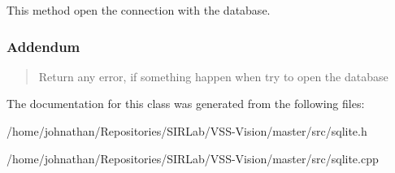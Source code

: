 This method open the connection with the database. 

\subsubsection*{Addendum }\begin{quote}
Return any error, if something happen when try to open the database \end{quote}


The documentation for this class was generated from the following files\+:\begin{DoxyCompactItemize}
\item 
/home/johnathan/\+Repositories/\+S\+I\+R\+Lab/\+V\+S\+S-\/\+Vision/master/src/sqlite.\+h\item 
/home/johnathan/\+Repositories/\+S\+I\+R\+Lab/\+V\+S\+S-\/\+Vision/master/src/sqlite.\+cpp\end{DoxyCompactItemize}
